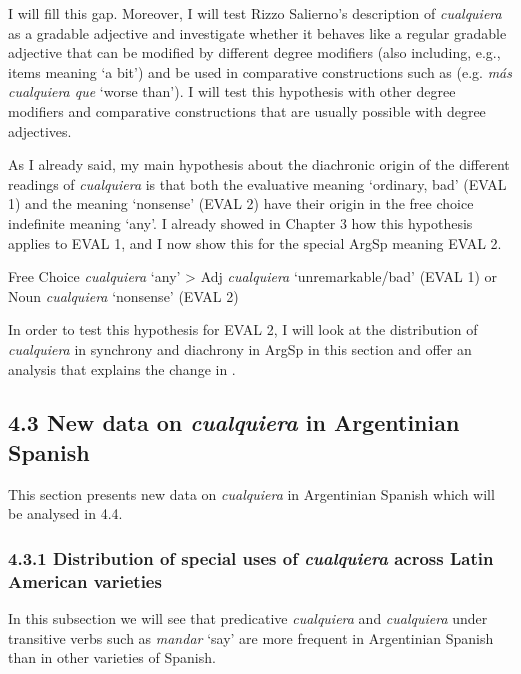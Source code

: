 \documentclass[output=paper]{langscibook}
\begin{document}
I will fill this gap. Moreover, I will test Rizzo Salierno’s description of \textit{cualquiera} as a gradable adjective and investigate whether it behaves like a regular gradable adjective that can be modified by different degree modifiers (also including, e.g., items meaning ‘a bit’) and be used in comparative constructions such as (e.g. \textit{más cualquiera que} ‘worse than’). I will test this hypothesis with other degree modifiers and comparative constructions that are usually possible with degree adjectives.

  As I already said, my main hypothesis about the diachronic origin of the different readings of \textit{cualquiera} is that both the evaluative meaning ‘ordinary, bad’ (EVAL 1) and the meaning ‘nonsense’ (EVAL 2) have their origin in the free choice indefinite meaning ‘any’. I already showed in Chapter 3 how this hypothesis applies to EVAL 1, and I now show this for the special ArgSp meaning EVAL 2.

    Free Choice \textit{cualquiera} ‘any’ > Adj \textit{cualquiera} ‘unremarkable/bad’ (EVAL 1) or Noun \textit{cualquiera} ‘nonsense’ (EVAL 2)

In order to test this hypothesis for EVAL 2, I will look at the distribution of \textit{cualquiera} in synchrony and diachrony in ArgSp in this section and offer an analysis that explains the change in . 

\subsection{\textbf{4.3} \textbf{New} \textbf{data} \textbf{on} \textbf{\textit{cualquiera} }\textbf{in} \textbf{Argentinian} \textbf{Spanish}}

This section presents new data on \textit{cualquiera} in Argentinian Spanish which will be analysed in 4.4.

\subsubsection{\textbf{4.3.1} \textbf{Distribution} \textbf{of} \textbf{special} \textbf{uses} \textbf{of} \textbf{\textit{cualquiera} }\textbf{across} \textbf{Latin} \textbf{American} \textbf{varieties}}

In this subsection we will see that predicative \textit{cualquiera} and \textit{cualquiera} under transitive verbs such as \textit{mandar} ‘say’ are more frequent in Argentinian Spanish than in other varieties of Spanish.
\end{document}
